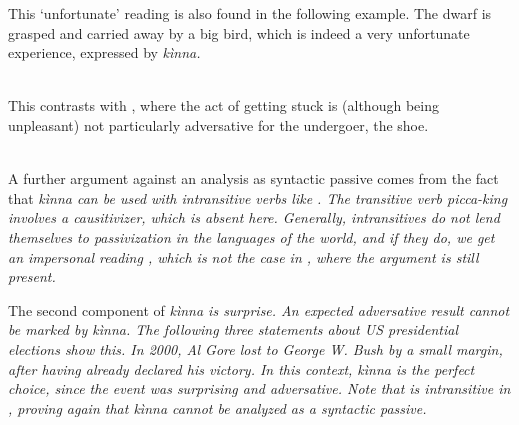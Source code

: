 This `unfortunate' reading   is also found in the following example. The dwarf is grasped and carried away by a big bird, which is indeed a very unfortunate experience, expressed by \em kìnna\em.

\\ 

This contrasts with , where the act of getting stuck is (although being unpleasant) not particularly adversative for the undergoer, the shoe.

 \\

A further argument against an analysis as syntactic passive comes from the fact that \em kìnna \em can be used with intransitive verbs like  . The transitive verb \em picca-king \em involves a causitivizer, which is absent here. Generally, intransitives do not lend themselves to passivization in the languages of the world, and if they do, we get an impersonal reading \citep{abc}, which is not the case in , where the argument  is still present.


The second component of \em kìnna \em is surprise. An expected adversative result cannot be marked by \em kìnna\em. The following three statements about US presidential elections show this. In 2000, Al Gore lost to George W. Bush by a small margin, after having already declared his victory. In this context, \em kìnna \em is the perfect choice, since the event was surprising and adversative. Note that  is intransitive in , proving again that  \em kìnna \em cannot be analyzed as a syntactic passive.

